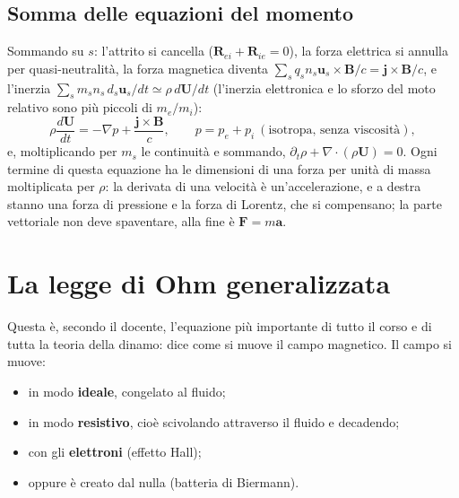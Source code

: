 \subsection{Somma delle equazioni del momento}
Sommando su $s$: l'attrito si cancella ($\mathbf{R}_{ei}+\mathbf{R}_{ie}=0$), la forza elettrica si annulla per quasi-neutralità, la forza magnetica diventa $\sum_sq_sn_s\mathbf{u}_s\times\mathbf{B}/c=\mathbf{j}\times\mathbf{B}/c$, e l'inerzia $\sum_sm_sn_s\,d_s\mathbf{u}_s/dt\simeq\rho\,d\mathbf{U}/dt$ (l'inerzia elettronica e lo sforzo del moto relativo sono più piccoli di $m_e/m_i$):
\begin{equation}
\rho\frac{d\mathbf{U}}{dt}=-\nabla p+\frac{\mathbf{j}\times\mathbf{B}}{c},\qquad p=p_e+p_i\ (\text{isotropa, senza viscosità}),
\end{equation}
e, moltiplicando per $m_s$ le continuità e sommando, $\partial_t\rho+\nabla\cdot(\rho\mathbf{U})=0$. Ogni termine di questa equazione ha le dimensioni di una forza per unità di massa moltiplicata per $\rho$: la derivata di una velocità è un'accelerazione, e a destra stanno una forza di pressione e la forza di Lorentz, che si compensano; la parte vettoriale non deve spaventare, alla fine è $\mathbf{F}=m\mathbf{a}$.

\section{La legge di Ohm generalizzata}
Questa è, secondo il docente, l'equazione più importante di tutto il corso e di tutta la teoria della dinamo: dice come si muove il campo magnetico. Il campo si muove:
\begin{itemize}
\item in modo \textbf{ideale}, congelato al fluido;
\item in modo \textbf{resistivo}, cioè scivolando attraverso il fluido e decadendo;
\item con gli \textbf{elettroni} (effetto Hall);
\item oppure è creato dal nulla (batteria di Biermann).
\end{itemize}

